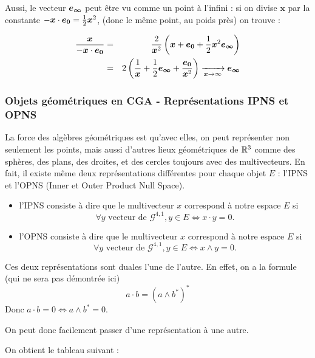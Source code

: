 Aussi, le vecteur $\bm{e_{\infty}}$ peut être vu comme un point à l'infini : si on divise $\bm{x}$ par la constante $-\bm{x} \cdot \bm{e_{0}} = \frac{1}{2}\bm{x}^2$, (donc le même point, au poids près) on trouve :

\begin{eqnarray*}
\frac{\bm{x}}{-\bm{x} \cdot \bm{e_{0}}} &=& \frac{2}{\bm{x}^2} \left( \bm{x} +\bm{e_{0}} + \frac{1}{2}\bm{x}^2 \bm{e_{\infty}}\right)\\
 &=& 2 \left( \frac{1}{\bm{x}} + \frac{1}{2}\bm{e_{\infty}} + \frac{\bm{e_{0}}}{\bm{x}^2} \right) \xrightarrow[\bm{x}\rightarrow \infty]{} \bm{e_{\infty}}\\
\end{eqnarray*}

\subsubsection{Objets géométriques en CGA - Représentations IPNS et OPNS}

La force des algèbres géométriques est qu'avec elles, on peut représenter non seulement les points, mais aussi d'autres lieux géométriques de $\mathbb{R}^3$ comme des sphères, des plans, des droites, et des cercles toujours avec des multivecteurs. En fait, il existe même deux représentations différentes pour chaque objet $E$ : l'IPNS et l'OPNS (Inner et Outer Product Null Space).

\begin{itemize}
\item l'IPNS consiste à dire que le multivecteur $x$ correspond à notre espace $E$ si $$\forall y \text{ vecteur de } \mathscr{G}^{4,1}, y\in E \Leftrightarrow x \cdot y =0.$$
\item l'OPNS consiste à dire que le multivecteur $x$ correspond à notre espace $E$ si $$\forall y \text{ vecteur de } \mathscr{G}^{4,1}, y\in E \Leftrightarrow x \wedge y =0.$$
\end{itemize}

Ces deux représentations sont duales l'une de l'autre. En effet, on a la formule (qui ne sera pas démontrée ici) $$a \cdot b = (a \wedge b^*)^*$$ 
Donc $a \cdot b =0 \Longleftrightarrow a \wedge b^*=0$. 

On peut donc facilement passer d'une représentation à une autre. 

On obtient le tableau suivant :\vspace*{0.3cm}

